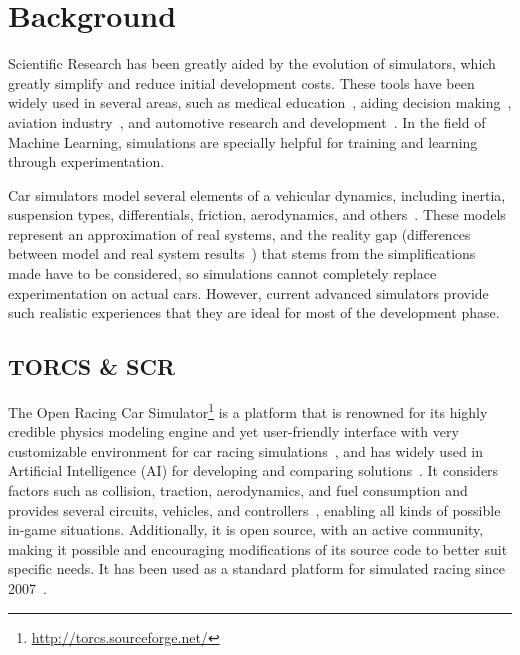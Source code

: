 \section{Background}\label{sec:2}

Scientific Research has been greatly aided by the evolution of simulators, which greatly simplify and reduce initial development costs. These tools have been widely used in several areas, such as medical education~\cite{MEDIC}, aiding decision making~\cite{useOfSimulaton2002}, aviation industry~\cite{AIR}, and automotive research and development~\cite{AUTR}. In the field of Machine Learning, simulations are specially helpful for training and learning through experimentation.

Car simulators model several elements of a vehicular dynamics, including inertia, suspension types, differentials, friction, aerodynamics, and others~\cite{SIMUTORCS}. These models represent an approximation of real systems, and the reality gap (differences between model and real system results~\cite{brookes2012authentic}) that stems from the simplifications made have to be considered, so simulations cannot completely replace experimentation on actual cars. However, current advanced simulators provide such realistic experiences that they are ideal for most of the development phase.

\subsection{TORCS \& SCR}
The Open Racing Car Simulator\footnote{\url{http://torcs.sourceforge.net/}} is a platform that is renowned for its highly credible physics modeling engine and yet user-friendly interface with very customizable environment for car racing simulations~\cite{SIMUTORCS,SCR}, and has widely used in Artificial Intelligence (AI) for developing and comparing solutions~\cite{2009}. It considers factors such as collision, traction, aerodynamics, and fuel consumption and provides several circuits, vehicles, and controllers~\cite{2009,Loiacono:2012:LEA:2212908.2212953}, enabling all kinds of possible in-game situations. Additionally, it is open source, with an active community, making it possible and encouraging modifications of its source code to better suit specific needs. It has been used as a standard platform for simulated racing since 2007~\cite{Loiacono:2012:LEA:2212908.2212953}.


